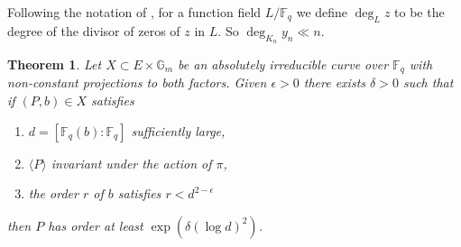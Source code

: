 \documentclass[11pt]{article}
\theoremstyle{plain}
\newtheorem{theorem}{Theorem}
\theoremstyle{definition}
\newcommand{\ang}[1]{\langle#1\rangle}
\def\F{\ensuremath{\mathbb{F}}}
\begin{document}
Following the notation of \cite{voloch2010}, for a function field $L/\F_q$ we define $\deg_Lz$ to 
be the degree of the divisor of zeros of $z$ in $L$. So $\deg_{K_n}y_n \ll n$.
\begin{theorem}
	\label{theo:order-general}
	Let $X \subset E \times \mathbb{G}_m$ be an absolutely irreducible curve over $\F_q$ with 
	non-constant projections to both factors. Given $\epsilon > 0$ there exists $\delta > 0$ such 
	that if $(P, b) \in X$ satisfies
	\begin{enumerate}[leftmargin = *, labelsep = *, align = left, itemsep = -0.1cm, font = 
	\normalfont, label = (\roman*)]
		\item $d = [\F_q(b) : \F_q]$ sufficiently large,
		\item $\ang{P}$ invariant under the action of $\pi$,
		\item the order $r$ of $b$ satisfies $r < d^{2 - \epsilon}$
	\end{enumerate}
	then $P$ has order at least $\exp(\delta (\log d)^2)$.
\end{theorem}
\end{document}
